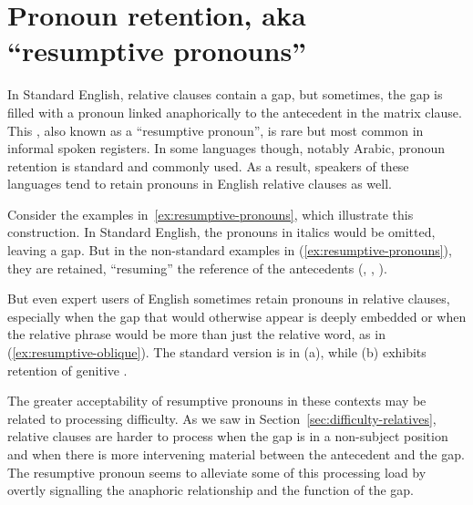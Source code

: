 \ea \label{ex:non-cleft2}
    \z
\z

\section{Pronoun retention, aka ``resumptive pronouns''}

In Standard English, relative clauses contain a gap, but sometimes, the gap is filled with a pronoun linked anaphorically to the antecedent in the matrix clause. This , also known as a ``resumptive pronoun'', is rare but most common in informal spoken registers. In some languages though, notably Arabic, pronoun retention is standard and commonly used. As a result, speakers of these languages tend to retain pronouns in English relative clauses as well.

Consider the examples in~\ref{ex:resumptive-pronouns}, which illustrate this construction.
\ea \label{ex:resumptive-pronouns}
    \z
\z
In Standard English, the pronouns in italics would be omitted, leaving a gap. But in the non-standard examples in (\ref{ex:resumptive-pronouns}), they are retained, \enquote{resuming} the reference of the antecedents (, , ).

But even expert users of English sometimes retain pronouns in relative clauses, especially when the gap that would otherwise appear is deeply embedded or when the relative phrase would be more than just the relative word, as in (\ref{ex:resumptive-oblique}). The standard version is in (a), while (b) exhibits retention of genitive .

\ea \label{ex:resumptive-oblique}
    \z
\z
The greater acceptability of resumptive pronouns in these contexts may be related to processing difficulty. As we saw in Section~\ref{sec:difficulty-relatives}, relative clauses are harder to process when the gap is in a non-subject position and when there is more intervening material between the antecedent and the gap. The resumptive pronoun seems to alleviate some of this processing load by overtly signalling the anaphoric relationship and the function of the gap.

